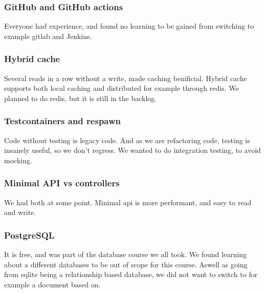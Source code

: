 \subsubsection{GitHub and GitHub actions}
Everyone had experience, 
and found no learning to be gained from switching to example 
gitlab and Jenkins.

\subsubsection{Hybrid cache}
Several reads in a row without a write, 
made caching benificial. Hybrid cache supports both local 
caching and distributed for example through redis. 
We planned to do redis, but it is still in the backlog.

\subsubsection{Testcontainers and respawn}
Code without testing is legacy code. 
And as we are refactoring code, testing is insanely 
useful, so we don't regress. 
We wanted to do integration testing, to avoid mocking.

\subsubsection{Minimal API vs controllers}
We had both at some point. Minimal api is more performant, 
and easy to read and write. 

\subsubsection{PostgreSQL}
It is free, and was part of the database course we all
took. We found learning about a different databases to be 
out of scope for this course. Aswell as going from sqlite 
being a relationship based database, we did not want to 
switch to for example a document based on.